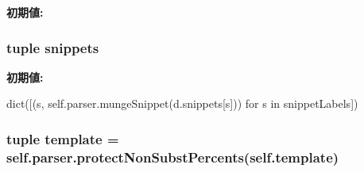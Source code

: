 \label{namespaceisa__parser_af5f95d808440c1302a57e2c64df31f1b}
{\bfseries 初期値:}
\begin{DoxyCode}
\end{DoxyCode}
\hypertarget{namespaceisa__parser_a34e16cdb1c61ee90cc70b4783e8b84c1}{
\subsubsection[{snippets}]{\setlength{\rightskip}{0pt plus 5cm}tuple {\bf snippets}}}
\label{namespaceisa__parser_a34e16cdb1c61ee90cc70b4783e8b84c1}
{\bfseries 初期値:}
\begin{DoxyCode}
dict([(s, self.parser.mungeSnippet(d.snippets[s]))
                             for s in snippetLabels])
\end{DoxyCode}
\hypertarget{namespaceisa__parser_a0f1bc778406f56e30920245ffbb1f9d4}{
\subsubsection[{template}]{\setlength{\rightskip}{0pt plus 5cm}tuple {\bf template} = self.parser.protectNonSubstPercents(self.template)}}
\label{namespaceisa__parser_a0f1bc778406f56e30920245ffbb1f9d4}
